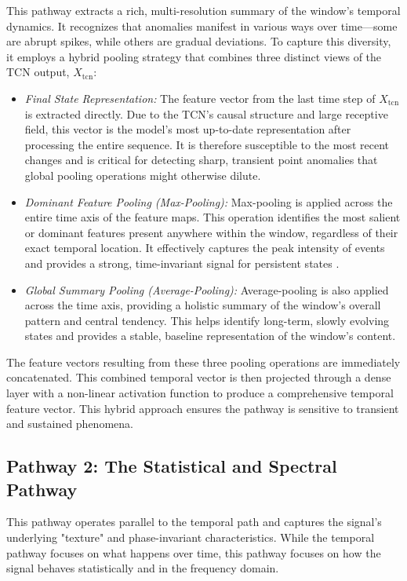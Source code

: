 \documentclass[journal]{IEEEtran}
\begin{document}
This pathway extracts a rich, multi-resolution summary of the window's temporal dynamics. It recognizes that anomalies manifest in various ways over time—some are abrupt spikes, while others are gradual deviations. To capture this diversity, it employs a hybrid pooling strategy that combines three distinct views of the TCN output, $X_{\text{tcn}}$:

\begin{itemize}[noitemsep, topsep=0pt, leftmargin=*]
    \item \textit{Final State Representation:} The feature vector from the last time step of $X_{\text{tcn}}$ is extracted directly. Due to the TCN's causal structure and large receptive field, this vector is the model's most up-to-date representation after processing the entire sequence. It is therefore susceptible to the most recent changes and is critical for detecting sharp, transient point anomalies that global pooling operations might otherwise dilute.

    \item \textit{Dominant Feature Pooling (Max-Pooling):} Max-pooling is applied across the entire time axis of the feature maps. This operation identifies the most salient or dominant features present anywhere within the window, regardless of their exact temporal location. It effectively captures the peak intensity of events and provides a strong, time-invariant signal for persistent states \cite{gholamalinezhad2020pooling}.

    \item \textit{Global Summary Pooling (Average-Pooling):} Average-pooling is also applied across the time axis, providing a holistic summary of the window's overall pattern and central tendency. This helps identify long-term, slowly evolving states and provides a stable, baseline representation of the window's content.
\end{itemize}

The feature vectors resulting from these three pooling operations are immediately concatenated. This combined temporal vector is then projected through a dense layer with a non-linear activation function to produce a comprehensive temporal feature vector. This hybrid approach ensures the pathway is sensitive to transient and sustained phenomena.

\subsection{Pathway 2: The Statistical and Spectral Pathway}
This pathway operates parallel to the temporal path and captures the signal's underlying "texture" and phase-invariant characteristics. While the temporal pathway focuses on what happens over time, this pathway focuses on how the signal behaves statistically and in the frequency domain.
\end{document}
